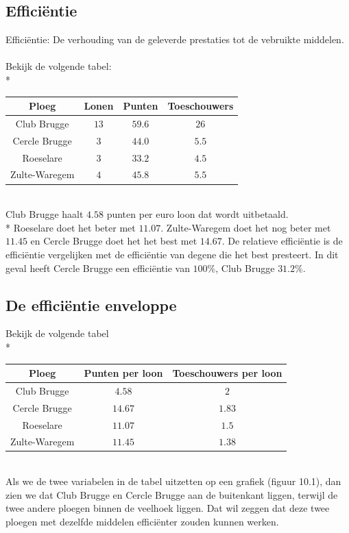 \documentclass[10pt]{article}
\begin{document}
\subsection{Effici\"entie}
Effici\"entie: De verhouding van de geleverde prestaties tot de vebruikte middelen.\\\\
Bekijk de volgende tabel:\\*
\begin{tabular}{| c | c | c | c |}
\hline
Ploeg & Lonen & Punten & Toeschouwers \\ \hline
Club Brugge & $13$ & $59.6$ & $26$ \\ \hline
Cercle Brugge & $3$ & $44.0$ & $5.5$ \\ \hline
Roeselare & $3$ & $33.2$ & $4.5$ \\ \hline
Zulte-Waregem & $4$ & $45.8$ & $5.5$ \\ \hline
\end{tabular}\\
Club Brugge haalt $4.58$ punten per euro loon dat wordt uitbetaald.\\*
Roeselare doet het beter met $11.07$. Zulte-Waregem doet het nog beter met $11.45$ en Cercle Brugge doet het het best met $14.67$. De relatieve effici\"entie is de effici\"entie vergelijken met de effici\"entie van degene die het best presteert. In dit geval heeft Cercle Brugge een effici\"entie van $100\%$, Club Brugge $31.2\%$.
\subsection{De effici\"entie enveloppe}
Bekijk de volgende tabel\\*
\begin{tabular}{| c | c | c |}
\hline
Ploeg & Punten per loon & Toeschouwers per loon \\ \hline
Club Brugge & $4.58$ & $2$ \\ \hline
Cercle Brugge & $14.67$ & $1.83$ \\ \hline
Roeselare & $11.07$ & $1.5$ \\ \hline
Zulte-Waregem & $11.45$ & $1.38$ \\ \hline
\end{tabular}\\
Als we de twee variabelen in de tabel uitzetten op een grafiek (figuur 10.1), dan zien we dat Club Brugge en Cercle Brugge aan de buitenkant liggen, terwijl de twee andere ploegen binnen de veelhoek liggen. Dat wil zeggen dat deze twee ploegen met dezelfde middelen effici\"enter zouden kunnen werken.
\end{document}
